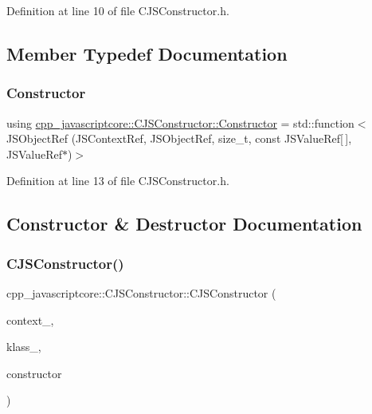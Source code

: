 Definition at line 10 of file C\+J\+S\+Constructor.\+h.



\subsection{Member Typedef Documentation}
\mbox{\label{classcpp__javascriptcore_1_1_c_j_s_constructor_aeeebb95fa01f05a9f0793ed7b176e759}} 
\subsubsection{\texorpdfstring{Constructor}{Constructor}}
{\footnotesize\ttfamily using \mbox{\hyperlink{classcpp__javascriptcore_1_1_c_j_s_constructor_aeeebb95fa01f05a9f0793ed7b176e759}{cpp\+\_\+javascriptcore\+::\+C\+J\+S\+Constructor\+::\+Constructor}} =  std\+::function$<$J\+S\+Object\+Ref (J\+S\+Context\+Ref, J\+S\+Object\+Ref, size\+\_\+t, const J\+S\+Value\+Ref\mbox{[}$\,$\mbox{]}, J\+S\+Value\+Ref$\ast$)$>$}



Definition at line 13 of file C\+J\+S\+Constructor.\+h.



\subsection{Constructor \& Destructor Documentation}
\mbox{\label{classcpp__javascriptcore_1_1_c_j_s_constructor_aa7487dce0f60a47ace1056f8218d2128}} 
\subsubsection{\texorpdfstring{C\+J\+S\+Constructor()}{CJSConstructor()}}
{\footnotesize\ttfamily cpp\+\_\+javascriptcore\+::\+C\+J\+S\+Constructor\+::\+C\+J\+S\+Constructor (\begin{DoxyParamCaption}\item[{J\+S\+Context\+Ref}]{context\+\_\+,  }\item[{J\+S\+Class\+Ref}]{klass\+\_\+,  }\item[{\mbox{\hyperlink{classcpp__javascriptcore_1_1_c_j_s_constructor_aeeebb95fa01f05a9f0793ed7b176e759}{Constructor}} \&}]{constructor }\end{DoxyParamCaption})}



